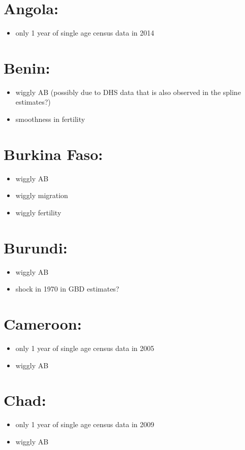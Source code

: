 \documentclass[12pt,a4paper]{article}
\date{\vspace{-5ex}}
\begin{document}
\section*{Angola:}
\begin{itemize}
\item only 1 year of single age census data in 2014
\end{itemize}

\section*{Benin:}
\begin{itemize}
\item wiggly AB (possibly due to DHS data that is also observed in the spline estimates?)
\item smoothness in fertility
\end{itemize}

\section*{Burkina Faso:}
\begin{itemize}
\item wiggly AB
\item wiggly migration
\item wiggly fertility
\end{itemize}

\section*{Burundi:}
\begin{itemize}
\item wiggly AB
\item shock in 1970 in GBD estimates?
\end{itemize}

\section*{Cameroon:}
\begin{itemize}
\item only 1 year of single age census data in 2005
\item wiggly AB
\end{itemize}

\section*{Chad:}
\begin{itemize}
\item only 1 year of single age census data in 2009
\item wiggly AB
\end{itemize}
\end{document}
